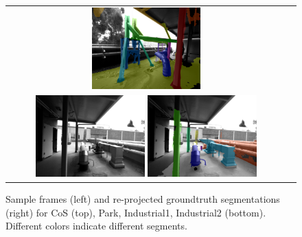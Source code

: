 \begin{figure}
\begin{center}
{{\begin{tabular}{cc}
        		{\includegraphics[width=0.4\textwidth]{figs/pipes2/gtseg_0059.png}}
        		\\
        		{\includegraphics[width=0.4\textwidth]{figs/pipes3/im_0007.png}}
        		{\includegraphics[width=0.4\textwidth]{figs/pipes3/gtseg_0007.png}}
              \end{tabular}
            }
      }
\end{center}
   \caption{\small Sample frames (left) and re-projected groundtruth segmentations (right) for CoS (top), Park, Industrial1, Industrial2 (bottom). Different colors indicate different segments.}
\label{fig:gtSegs}
\end{figure}

